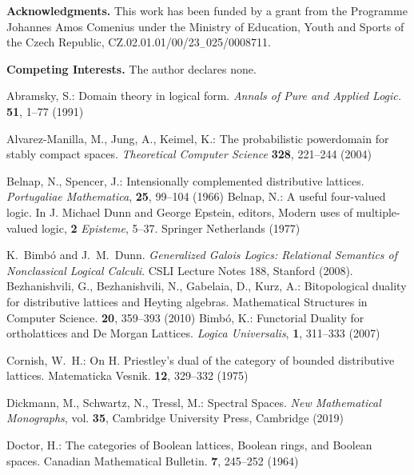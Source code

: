 \documentclass{amsart}
\theoremstyle{plain}
\theoremstyle{definition}
\begin{document}
\par
\vspace{.4cm} 
\noindent \textbf{Acknowledgments.} This work has been funded by a grant from the Programme Johannes Amos Comenius
under the Ministry of Education, Youth and Sports of the Czech Republic,
CZ.02.01.01/00/23$_{-}$025/0008711.


\par
\vspace{.4cm} 
\noindent \textbf{Competing Interests.} The author declares none. 


\begin{thebibliography}{}

 Abramsky, S.: Domain theory in logical form. \emph{Annals of Pure and Applied Logic.} \textbf{51}, 1--77 (1991)

 Alvarez-Manilla, M., Jung, A., Keimel, K.: The probabilistic powerdomain for stably compact spaces.
\emph{Theoretical Computer Science} \textbf{328}, 221--244 (2004)

 Belnap, N., Spencer, J.: Intensionally complemented distributive lattices. \emph{Portugaliae Mathematica}, \textbf{25}, 99--104 (1966)
 Belnap, N.: A useful four-valued logic. In J. Michael Dunn and George Epstein, editors, Modern uses
of multiple-valued logic, \textbf{2} \emph{Episteme}, 5--37. Springer Netherlands (1977)

K.~Bimb\'o and J.~M.~Dunn.
\newblock \emph{Generalized Galois Logics: Relational Semantics of Nonclassical Logical Calculi}.
\newblock CSLI Lecture Notes 188, Stanford (2008).
  Bezhanishvili, G., Bezhanishvili, N., Gabelaia, D., Kurz, A.: Bitopological duality for distributive lattices and Heyting algebras. Mathematical Structures in Computer Science. \textbf{20}, 359--393 (2010) 
  Bimb\'o, K.: Functorial Duality for ortholattices and De Morgan Lattices. \emph{Logica Universalis}, \textbf{1}, 311--333 (2007)

 Cornish, W.~H.: On H. Priestley’s dual of the category of bounded distributive lattices. Matematicka
Vesnik. \textbf{12}, 329--332 (1975)

 Dickmann, M., Schwartz, N., Tressl, M.: Spectral Spaces. \emph{New Mathematical Monographs}, vol. \textbf{35}, Cambridge University Press, Cambridge (2019)

 Doctor, H.: The categories of Boolean lattices, Boolean rings, and Boolean spaces. Canadian Mathematical Bulletin. \textbf{7}, 245--252 (1964)


\end{thebibliography}
\end{document}
